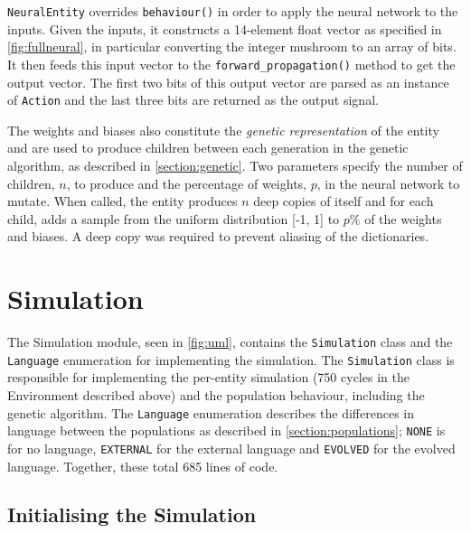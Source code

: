 \documentclass[12pt,a4paper]{report}
\begin{document}
    


\texttt{NeuralEntity} overrides \texttt{behaviour()} in order to apply the neural network to the inputs. Given the inputs, it constructs a 14-element float vector as specified in \cref{fig:fullneural}, in particular converting the integer mushroom to an array of bits. It then feeds this input vector to the \texttt{forward\_propagation()} method to get the output vector. The first two bits of this output vector are parsed as an instance of \texttt{Action} and the last three bits are returned as the output signal.

The weights and biases also constitute the \emph{genetic representation} of the entity and are used to produce children between each generation in the genetic algorithm, as described in \cref{section:genetic}.  Two parameters specify the number of children, $n$, to produce and the percentage of weights, $p$, in the neural network to mutate. When called, the entity produces $n$ deep copies of itself and for each child, adds a sample from the uniform distribution [-1, 1] to $p\%$ of the weights and biases. A deep copy was required to prevent aliasing of the dictionaries.

\section{Simulation}\label{section:simulation}

The Simulation module, seen in \cref{fig:uml}, contains the \texttt{Simulation} class and the \texttt{Language} enumeration for implementing the simulation. The \texttt{Simulation} class is responsible for implementing the per-entity simulation (750 cycles in the Environment described above) and the population behaviour, including the genetic algorithm. The \texttt{Language} enumeration describes the differences in language between the populations as described in \cref{section:populations}; \texttt{NONE} is for no language, \texttt{EXTERNAL} for the external language and \texttt{EVOLVED} for the evolved language. Together, these total 685 lines of code.

\subsection{Initialising the Simulation}\label{section:simulation-initialise}
\end{document}

